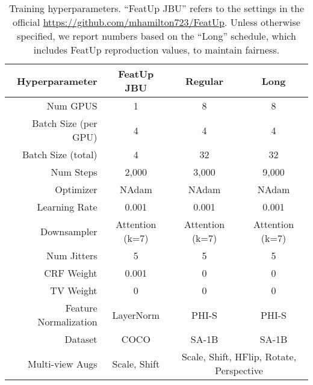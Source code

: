 \begin{table}[]
    \centering
    \begin{tabular}{r|c|cc}
        \bf{Hyperparameter}  & \bf{FeatUp JBU}        & \bf{Regular}           & \bf{Long} \\
        \hline
        Num GPUS             & 1                      & 8                      & 8                 \\
        Batch Size (per GPU) & 4                      & 4                      & 4                 \\
        Batch Size (total)   & 4                      & 32                     & 32                \\
        Num Steps            & 2,000                  & 3,000                  & 9,000             \\
        Optimizer            & NAdam                  & NAdam                  & NAdam             \\
        Learning Rate        & 0.001                  & 0.001                  & 0.001             \\
        Downsampler          & Attention (k=7)        & Attention (k=7)        & Attention (k=7)   \\
        Num Jitters          & 5                      & 5                      & 5                 \\
        CRF Weight           & 0.001                  & 0                      & 0                 \\
        TV Weight            & 0                      & 0                      & 0                 \\
        Feature Normalization& LayerNorm              & PHI-S                  & PHI-S             \\
        Dataset              & COCO                   & SA-1B                  & SA-1B             \\
        Multi-view Augs      & Scale, Shift           & \multicolumn{2}{c}{Scale, Shift, HFlip, Rotate, Perspective}
    \end{tabular}
    \caption{Training hyperparameters. ``FeatUp JBU'' refers to the settings in the official \href{https://github.com/mhamilton723/FeatUp}{https://github.com/mhamilton723/FeatUp}. Unless otherwise specified, we report numbers based on the ``Long'' schedule, which includes FeatUp reproduction values, to maintain fairness.}
    \label{tab:upsampler_hparams}
\end{table}

